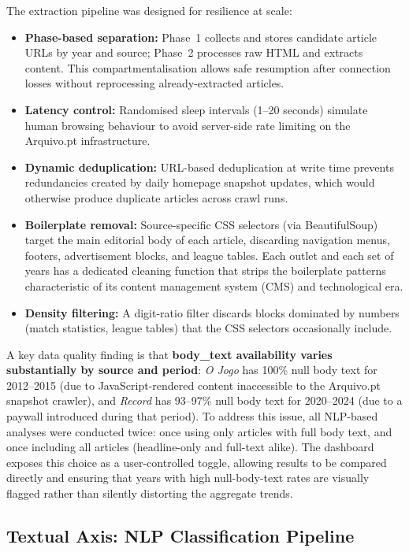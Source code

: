 \documentclass[11pt,a4paper]{article}
\begin{document}
The extraction pipeline was designed for resilience at scale:

\begin{itemize}[itemsep=2pt]
  \item \textbf{Phase-based separation:} Phase~1 collects and stores candidate article URLs by year and source; Phase~2 processes raw HTML and extracts content. This compartmentalisation allows safe resumption after connection losses without reprocessing already-extracted articles.
  \item \textbf{Latency control:} Randomised sleep intervals (1–20 seconds) simulate human browsing behaviour to avoid server-side rate limiting on the Arquivo.pt infrastructure.
  \item \textbf{Dynamic deduplication:} URL-based deduplication at write time prevents redundancies created by daily homepage snapshot updates, which would otherwise produce duplicate articles across crawl runs.
  \item \textbf{Boilerplate removal:} Source-specific CSS selectors (via BeautifulSoup) target the main editorial body of each article, discarding navigation menus, footers, advertisement blocks, and league tables. Each outlet and each set of years has a dedicated cleaning function that strips the boilerplate patterns characteristic of its content management system (CMS) and technological era.
  \item \textbf{Density filtering:} A digit-ratio filter discards blocks dominated by numbers (match statistics, league tables) that the CSS selectors occasionally include.
\end{itemize}

A key data quality finding is that \textbf{body\_text availability varies substantially by source and period}: \textit{O Jogo} has 100\% null body text for 2012–2015 (due to JavaScript-rendered content inaccessible to the Arquivo.pt snapshot crawler), and \textit{Record} has 93–97\% null body text for 2020–2024 (due to a paywall introduced during that period). To address this issue, all NLP-based analyses were conducted twice: once using only articles with full body text, and once including all articles (headline-only and full-text alike). The dashboard exposes this choice as a user-controlled toggle, allowing results to be compared directly and ensuring that years with high null-body-text rates are visually flagged rather than silently distorting the aggregate trends.

\subsection{Textual Axis: NLP Classification Pipeline}
\label{sec:nlp}
\end{document}
